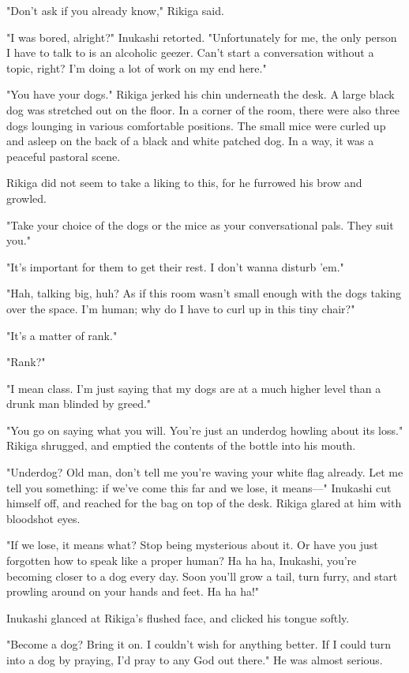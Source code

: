 "Don't ask if you already know," Rikiga said.

"I was bored, alright?" Inukashi retorted. "Unfortunately for me, the
only person I have to talk to is an alcoholic geezer. Can't start a
conversation without a topic, right? I'm doing a lot of work on my end
here."

"You have your dogs." Rikiga jerked his chin underneath the desk. A
large black dog was stretched out on the floor. In a corner of the room,
there were also three dogs lounging in various comfortable positions.
The small mice were curled up and asleep on the back of a black and
white patched dog. In a way, it was a peaceful pastoral scene.

Rikiga did not seem to take a liking to this, for he furrowed his brow
and growled.

"Take your choice of the dogs or the mice as your conversational pals.
They suit you."

"It's important for them to get their rest. I don't wanna disturb 'em."

"Hah, talking big, huh? As if this room wasn't small enough with the
dogs taking over the space. I'm human; why do I have to curl up in this
tiny chair?"

"It's a matter of rank."

"Rank?"

"I mean class. I'm just saying that my dogs are at a much higher level
than a drunk man blinded by greed."

"You go on saying what you will. You're just an underdog howling about
its loss." Rikiga shrugged, and emptied the contents of the bottle into
his mouth.

"Underdog? Old man, don't tell me you're waving your white flag already.
Let me tell you something: if we've come this far and we lose, it
means---" Inukashi cut himself off, and reached for the bag on top of the
desk. Rikiga glared at him with bloodshot eyes.

"If we lose, it means what? Stop being mysterious about it. Or have you
just forgotten how to speak like a proper human? Ha ha ha, Inukashi,
you're becoming closer to a dog every day. Soon you'll grow a tail, turn
furry, and start prowling around on your hands and feet. Ha ha ha!"

Inukashi glanced at Rikiga's flushed face, and clicked his tongue
softly.

"Become a dog? Bring it on. I couldn't wish for anything better. If I
could turn into a dog by praying, I'd pray to any God out there." He was
almost serious.

